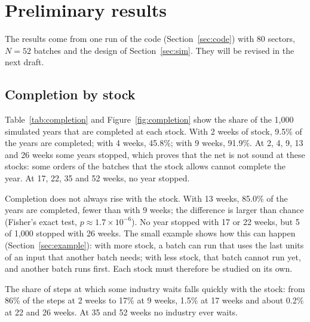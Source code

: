 \documentclass[11pt]{article}
\begin{document}
\section{Preliminary results}\label{sec:results}

The results come from one run of the code (Section~\ref{sec:code}) with 80 sectors, $N=52$ batches and the design of Section~\ref{sec:sim}. They will be revised in the next draft.

\subsection{Completion by stock}

Table~\ref{tab:completion} and Figure~\ref{fig:completion} show the share of the 1{,}000 simulated years that are completed at each stock. With 2 weeks of stock, 9.5\% of the years are completed; with 4 weeks, 45.8\%; with 9 weeks, 91.9\%. At 2, 4, 9, 13 and 26 weeks some years stopped, which proves that the net is not sound at these stocks: some orders of the batches that the stock allows cannot complete the year. At 17, 22, 35 and 52 weeks, no year stopped.

Completion does not always rise with the stock. With 13 weeks, 85.0\% of the years are completed, fewer than with 9 weeks; the difference is larger than chance (Fisher's exact test, $p\approx1.7\times10^{-6}$). No year stopped with 17 or 22 weeks, but 5 of 1{,}000 stopped with 26 weeks. The small example shows how this can happen (Section~\ref{sec:example}): with more stock, a batch can run that uses the last units of an input that another batch needs; with less stock, that batch cannot run yet, and another batch runs first. Each stock must therefore be studied on its own.

The share of steps at which some industry waits falls quickly with the stock: from 86\% of the steps at 2 weeks to 17\% at 9 weeks, 1.5\% at 17 weeks and about 0.2\% at 22 and 26 weeks. At 35 and 52 weeks no industry ever waits.
\end{document}
